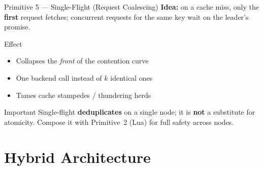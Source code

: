 \documentclass[aspectratio=169, 11pt]{beamer}
\begin{document}
\begin{frame}{Primitive 5 --- Single-Flight (Request Coalescing)}
\textbf{Idea:} on a cache miss, only the \textbf{first} request fetches; concurrent requests for the same key wait on the leader's promise.
\begin{block}{Effect}
\begin{itemize}
    \item Collapses the \emph{front} of the contention curve
    \item One backend call instead of $k$ identical ones
    \item Tames cache stampedes / thundering herds
\end{itemize}
\end{block}
\begin{alertblock}{Important}
Single-flight \textbf{deduplicates} on a single node; it is \textbf{not} a substitute for atomicity. Compose it with Primitive~2 (Lua) for full safety across nodes.
\end{alertblock}
\end{frame}

\section{Hybrid Architecture}
\end{document}
